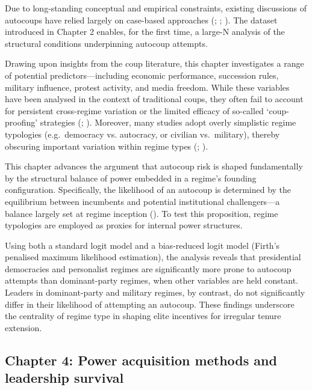 \documentclass[
  12pt,
]{report}
\begin{document}
Due to long-standing conceptual and empirical constraints, existing
discussions of autocoups have relied largely on case-based approaches
(;
;
). The dataset
introduced in Chapter 2 enables, for the first time, a large-N analysis
of the structural conditions underpinning autocoup attempts.

Drawing upon insights from the coup literature, this chapter
investigates a range of potential predictors---including economic
performance, succession rules, military influence, protest activity, and
media freedom. While these variables have been analysed in the context
of traditional coups, they often fail to account for persistent
cross-regime variation or the limited efficacy of so-called
`coup-proofing' strategies (; ). Moreover, many studies
adopt overly simplistic regime typologies (e.g.~democracy vs. autocracy,
or civilian vs.~military), thereby obscuring important variation within
regime types (;
).

This chapter advances the argument that autocoup risk is shaped
fundamentally by the structural balance of power embedded in a regime's
founding configuration. Specifically, the likelihood of an autocoup is
determined by the equilibrium between incumbents and potential
institutional challengers---a balance largely set at regime inception
(). To test
this proposition, regime typologies are employed as proxies for internal
power structures.

Using both a standard logit model and a bias-reduced logit model
(Firth's penalised maximum likelihood estimation), the analysis reveals
that presidential democracies and personalist regimes are significantly
more prone to autocoup attempts than dominant-party regimes, when other
variables are held constant. Leaders in dominant-party and military
regimes, by contrast, do not significantly differ in their likelihood of
attempting an autocoup. These findings underscore the centrality of
regime type in shaping elite incentives for irregular tenure extension.

\subsection*{Chapter 4: Power acquisition methods and leadership
survival}\label{chapter-4-power-acquisition-methods-and-leadership-survival}
\end{document}
